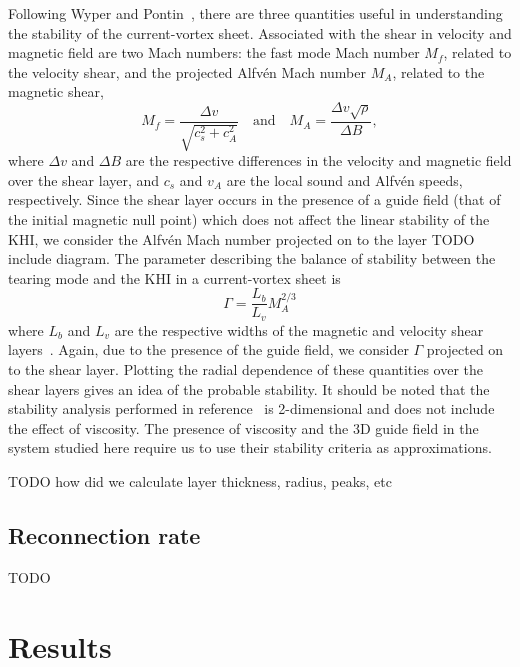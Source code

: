 Following Wyper and Pontin~\cite{wyperKelvinHelmholtzInstabilityCurrentvortex2013}, there are three quantities useful in understanding the stability of the current-vortex sheet. Associated with the shear in velocity and magnetic field are two Mach numbers: the fast mode Mach number $M_f$, related to the velocity shear, and the projected Alfv\'en Mach number $M_A$, related to the magnetic shear,
\begin{equation}
  \label{eq:mach_numbers}
  M_f = \frac{\Delta v}{\sqrt{c_s^2 + c_A^2}} \quad \text{and} \quad M_A = \frac{\Delta v \sqrt{\rho}}{\Delta B},
\end{equation}
where $\Delta v$ and $\Delta B$ are the respective differences in the velocity and magnetic field over the shear layer, and $c_s$ and $v_A$ are the local sound and Alfv\'en speeds, respectively. Since the shear layer occurs in the presence of a guide field (that of the initial magnetic null point) which does not affect the linear stability of the KHI, we consider the Alfv\'en Mach number projected on to the layer TODO include diagram. The parameter describing the balance of stability between the tearing mode and the KHI in a current-vortex sheet is
\begin{equation}
  \label{eq:khi_stability_param}
  \Gamma = \frac{L_b}{L_v} M_A^{2/3}
\end{equation}
where $L_b$ and $L_v$ are the respective widths of the magnetic and velocity shear layers~\cite{einaudiResistiveInstabilitiesFlowing1986}. Again, due to the presence of the guide field, we consider $\Gamma$ projected on to the shear layer. Plotting the radial dependence of these quantities over the shear layers gives an idea of the probable stability. It should be noted that the stability analysis performed in reference~\cite{einaudiResistiveInstabilitiesFlowing1986} is 2-dimensional and does not include the effect of viscosity. The presence of viscosity and the 3D guide field in the system studied here require us to use their stability criteria as approximations.

TODO how did we calculate layer thickness, radius, peaks, etc

\subsection{Reconnection rate}

TODO

\section{Results}

